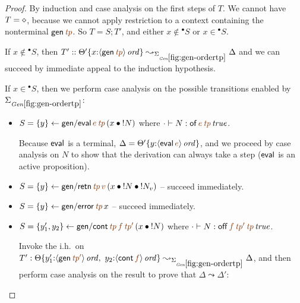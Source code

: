 \begin{proof}
By induction and case analysis on the first steps of $T$. We cannot 
have $T = \diamond$, because we cannot apply restriction to a context
containing the nonterminal ${\sf gen}\,\lf{{\it tp}}$.
So $T = S; T'$, and either $x \notin {^\bullet}S$ or $x \in {^\bullet}S$. 

If $x \notin {^\bullet}S$, then $T' ::
\tackon{\Theta'}{x{:}\istrue{\susp{{\sf gen}\,\lf{{\it tp}}}}}
\leadsto_{\siggenordertp} \Delta$ and we can succeed by immediate appeal to the
induction hypothesis.

If $x \in {^\bullet}S$, then we perform case analysis on the possible
transitions enabled by $\siggenordertp$:

\begin{itemize}
\item $S = \trstep{y}{{\sf gen/eval}\,\lf{e}\,\lf{{\it
        tp}}\,{(\tfuser{x}{\tbangr{N}})}}$
  where $\cdot \vdash N : \isconc{{\sf of}\,\lf{e}\,\lf{{\it tp}}}$.

  Because ${\sf eval}$ is a terminal, $\Delta = \tackon{\Theta'}{y{:}\istrue{\susp{{\sf eval}\,\lf{e}}}}$, and we proceed by case
  analysis on $N$ to show that the derivation can always take a step
  (${\sf eval}$ is an active proposition).

\medskip
\item $S = \trstep{y}{{\sf gen/retn}\,\lf{{\it tp}}\,\lf{v}\,(\tfuser{x}{\tfuser{\tbangr{N}}{\tbangr{N_v}}})}$ -- succeed immediately.

\medskip
\item $S = \trstep{y}{{\sf gen/error}\,\lf{{\it tp}}\,{x}}$ -- succeed immediately.

\medskip
\item $S = \trstep{y_1', y_2}{{\sf gen/cont}\,\lf{{\it tp}}\,\lf{f}\,\lf{{\it tp}'}\,(\tfuser{x}{\tbangr{N}})}$ where $\cdot \vdash N : \isconc{{\sf off}\,\lf{f}\,\lf{{\it tp}'}\,\lf{{\it tp}}}$.

Invoke the i.h.~on  
$T' :  \tackon{\Theta}{y_1'{:}\istrue{\susp{{\sf gen}\,\lf{{\it tp}'}}}, ~ 
                        y_2{:}\istrue{\susp{{\sf cont}\,\lf{f}}}}
\leadsto_{\siggenordertp} \Delta$, and then perform case analysis on the result
to prove that $\Delta \leadsto \Delta'$:


\end{itemize}
\end{proof}
